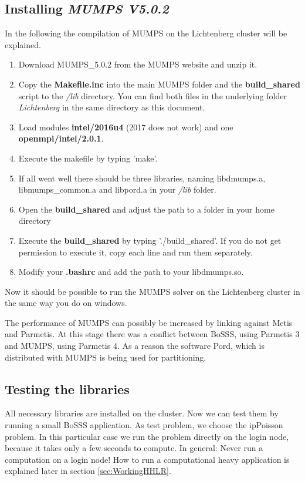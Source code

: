 \documentclass[11pt,twoside,a4paper]{fdyartcl}
\begin{document}
\subsection{Installing \emph{MUMPS V5.0.2}}
In the following the compilation of MUMPS on the Lichtenberg cluster will be explained.
\begin{enumerate}
	\item Download MUMPS\_5.0.2 from the MUMPS website and unzip it.
	\item Copy the \textbf{Makefile.inc} into the main MUMPS folder and the \textbf{build\_shared} script to the \textit{/lib} directory. You can find both files in the underlying folder \textit{Lichtenberg} in the same directory as this document.
	\item Load modules \textbf{intel/2016u4} (2017 does not work) and one \textbf{openmpi/intel/2.0.1}.
	\item Execute the makefile by typing 'make'.
	\item If all went well there should be three libraries, naming libdmumps.a, libmumps\_common.a and libpord.a in your \textit{/lib} folder.
	\item Open the \textbf{build\_shared} and adjust the path to a folder in your home directory
	\item Execute the \textbf{build\_shared} by typing './build\_shared'. If you do not get permission to execute it, copy each line and run them separately.
	\item Modify your \textbf{.bashrc} and add the path to your libdmumps.so.	
\end{enumerate}
Now it should be possible to run the MUMPS solver on the Lichtenberg cluster in the same way you do on windows. 

The performance of MUMPS can possibly be increased by linking against Metis and Parmetis. At this stage there was a conflict between BoSSS, using Parmetis 3 and MUMPS, using Parmetis 4. As a reason the software Pord, which is distributed with MUMPS is being used for partitioning.

\subsection{Testing the libraries}
\label{sec:testing}
All necessary libraries are installed on the cluster. Now we can test them by running a small BoSSS application. As test problem, we choose the ipPoisson problem. In this particular case we run the problem directly on the login node, because it takes only a few seconds to compute. In general: Never run a computation on a login node! How to run a computational heavy application is explained later in section \ref{sec:WorkingHHLR}.
\end{document}
